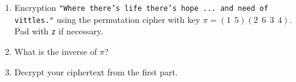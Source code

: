 \mbox{}
  \begin{enumerate}
  \item Encryption \texttt{"Where there's life there's hope ... and need of vittles."}
  using the permutation cipher with key
  $\pi = (1 \ \ 5)(2 \ \ 6 \ \ 3 \ \ 4)$.
  Pad with \verb!z! if necessary.

  \item
  What is the inverse of $\pi$?

  \item
  Decrypt your ciphertext from the first part.
\end{enumerate}

